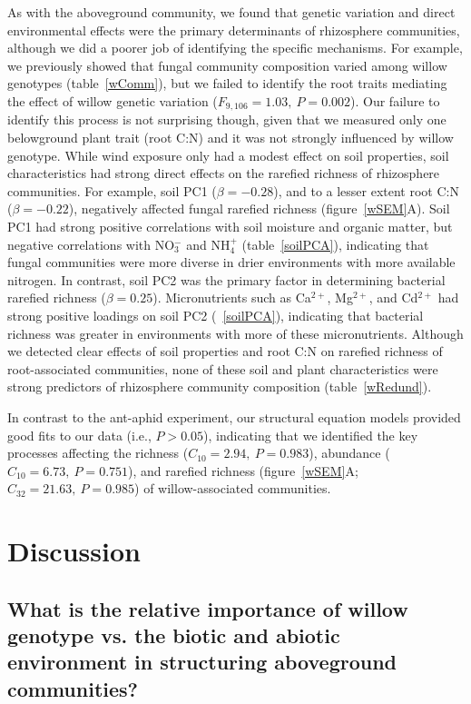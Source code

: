 \documentclass[11pt]{article}
\begin{document}
As with the aboveground community, we found that genetic
variation and direct environmental effects were the primary determinants
of rhizosphere communities, although we did a poorer job of identifying
the specific mechanisms. For example, we previously showed that fungal
community composition varied among willow genotypes (table~\ref{wComm}), but we
failed to identify the root traits mediating the effect of willow
genetic variation (\(F_{9,106}=1.03,\ P=0.002\)). Our failure to identify this
process is not surprising though, given that we measured only one
belowground plant trait (root C:N) and it was not strongly influenced by
willow genotype. While wind exposure only had a modest effect on soil
properties, soil characteristics had strong direct effects on the
rarefied richness of rhizosphere communities. For example, soil PC1
($\beta = -0.28$), and to a lesser extent root C:N ($\beta =
-0.22$), negatively affected fungal rarefied richness (figure~\ref{wSEM}A). Soil PC1
had strong positive correlations with soil moisture and organic matter,
but negative correlations with NO$_3^-$ and NH$_4^+$ (table~\ref{soilPCA}), indicating that
fungal communities were more diverse in drier environments with more
available nitrogen. In contrast, soil PC2 was the primary factor in
determining bacterial rarefied richness ($\beta = 0.25$).
Micronutrients such as Ca$^{2+}$, Mg$^{2+}$, and Cd$^{2+}$ had strong positive loadings
on soil PC2 (~\ref{soilPCA}), indicating that bacterial richness was greater in
environments with more of these micronutrients. Although we detected
clear effects of soil properties and root C:N on rarefied richness of
root-associated communities, none of these soil and plant
characteristics were strong predictors of rhizosphere community
composition (table~\ref{wRedund}).

In contrast to the ant-aphid experiment, our structural equation models
provided good fits to our data (i.e., \(P>0.05\)), indicating
that we identified the key processes affecting the richness (\(C_{10}=2.94,\ P=0.983\)), abundance (\(C_{10}=6.73,\ P=0.751\)), and rarefied richness
(figure~\ref{wSEM}A; \(C_{32}=21.63,\ P=0.985\)) of willow-associated communities.

\section*{Discussion}

\subsection*{What is the relative importance of willow genotype vs. the
biotic and abiotic environment in structuring aboveground
communities?}
\end{document}
